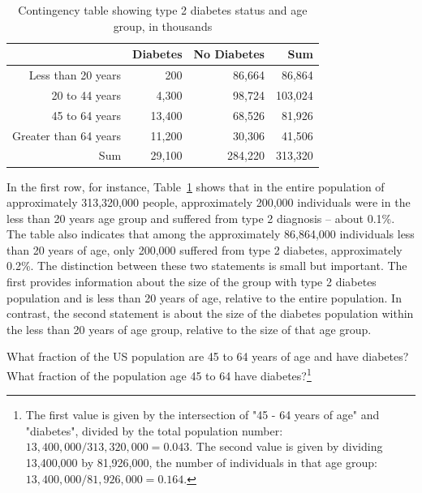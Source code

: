 \begin{table}[ht]
	\centering
	\begin{tabular}{rrrr}
		\hline
		& Diabetes & No Diabetes & Sum \\ 
		\hline
		Less than 20 years & 200 & 86,664 & 86,864 \\ 
		20 to 44 years & 4,300 & 98,724 & 103,024 \\ 
		45 to 64 years & 13,400 & 68,526 & 81,926 \\ 
		Greater than 64 years & 11,200 & 30,306 & 41,506 \\ 
		Sum & 29,100 & 284,220 & 313,320 \\ 
		\hline
	\end{tabular}
	\caption{Contingency table showing type 2 diabetes status and age group, in thousands}
	\label{DiabetesAgeContTable}
\end{table}

In the first row, for instance, Table~\ref{DiabetesAgeContTable} shows that in the entire population of approximately 313,320,000 people, approximately 200,000 individuals were in the less than 20 years age group and suffered from type 2 diagnosis -- about 0.1\%. The table also indicates that among the approximately 86,864,000 individuals less than 20 years of age, only 200,000 suffered from type 2 diabetes, approximately 0.2\%.  The distinction between these two statements is small but important. The first provides information about the size of the group with type 2 diabetes population and is less than 20 years of age, relative to the entire population. In contrast, the second statement is about the size of the diabetes population within the less than 20 years of age group, relative to the size of that age group. 

\begin{exercise} \label{DiabetesAge20to44}

What fraction of the US population are 45 to 64 years of age and have diabetes?  What fraction of the population age 45 to 64 have diabetes?\footnote{The first value is given by the intersection of "45 - 64 years of age" and "diabetes", divided by the total population number: $13,400,000/313,320,000 = 0.043$. The second value is given by dividing 13,400,000 by 81,926,000, the number of individuals in that age group: $13,400,000/81,926,000 = 0.164$.}

\end{exercise}

